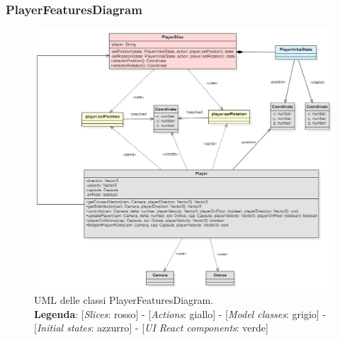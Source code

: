 	\begin{landscape}
		\thispagestyle{empty}
		\subsubsection{PlayerFeaturesDiagram}
		\begin{figure}[H]
			\centering
			\includegraphics[scale=0.7, keepaspectratio]{./res/images/PlayerFeaturesDiagram.PNG}
			\caption[UML delle classi PlayerFeaturesDiagram]{
				UML delle classi PlayerFeaturesDiagram.
				\\
				\textbf{Legenda}: 
				[\textit{Slices}: rosso] -
				[\textit{Actions}: giallo] -
				[\textit{Model classes}: grigio] -
				[\textit{Initial states}: azzurro] -
				[\textit{UI React components}: verde]}
			\end{figure}
		\end{landscape}
		\restoregeometry
